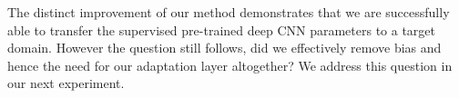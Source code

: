 



The distinct improvement of our method demonstrates that we are successfully able to transfer the supervised pre-trained deep CNN parameters to a target domain. However the question still follows, did we effectively remove bias and hence the need for our adaptation layer altogether? We address this question in our next experiment.


%
%





